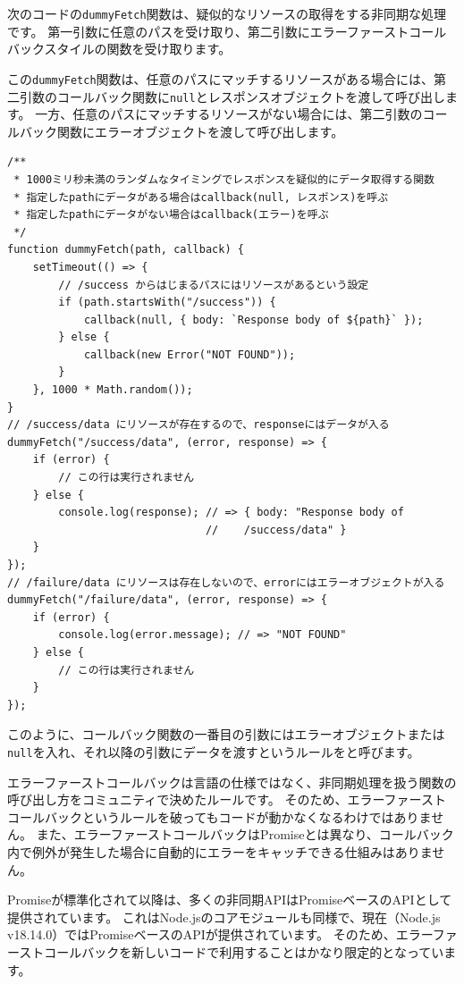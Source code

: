 \begin{tcolorbox}[enhanced jigsaw,breakable,title=エラーファーストコールバック]
次のコードの\texttt{dummyFetch}関数は、疑似的なリソースの取得をする非同期な処理です。
第一引数に任意のパスを受け取り、第二引数にエラーファーストコールバックスタイルの関数を受け取ります。

この\texttt{dummyFetch}関数は、任意のパスにマッチするリソースがある場合には、第二引数のコールバック関数に\texttt{null}とレスポンスオブジェクトを渡して呼び出します。
一方、任意のパスにマッチするリソースがない場合には、第二引数のコールバック関数にエラーオブジェクトを渡して呼び出します。

\begin{lstlisting}
/**
 * 1000ミリ秒未満のランダムなタイミングでレスポンスを疑似的にデータ取得する関数
 * 指定したpathにデータがある場合はcallback(null, レスポンス)を呼ぶ
 * 指定したpathにデータがない場合はcallback(エラー)を呼ぶ
 */
function dummyFetch(path, callback) {
    setTimeout(() => {
        // /success からはじまるパスにはリソースがあるという設定
        if (path.startsWith("/success")) {
            callback(null, { body: `Response body of ${path}` });
        } else {
            callback(new Error("NOT FOUND"));
        }
    }, 1000 * Math.random());
}
// /success/data にリソースが存在するので、responseにはデータが入る
dummyFetch("/success/data", (error, response) => {
    if (error) {
        // この行は実行されません
    } else {
        console.log(response); // => { body: "Response body of 
                               //    /success/data" }
    }
});
// /failure/data にリソースは存在しないので、errorにはエラーオブジェクトが入る
dummyFetch("/failure/data", (error, response) => {
    if (error) {
        console.log(error.message); // => "NOT FOUND"
    } else {
        // この行は実行されません
    }
});
\end{lstlisting}

このように、コールバック関数の一番目の引数にはエラーオブジェクトまたは\texttt{null}を入れ、それ以降の引数にデータを渡すというルールを\textbf{}と呼びます。

エラーファーストコールバックは言語の仕様ではなく、非同期処理を扱う関数の呼び出し方をコミュニティで決めたルールです。
そのため、エラーファーストコールバックというルールを破ってもコードが動かなくなるわけではありません。
また、エラーファーストコールバックはPromiseとは異なり、コールバック内で例外が発生した場合に自動的にエラーをキャッチできる仕組みはありません。

Promiseが標準化されて以降は、多くの非同期APIはPromiseベースのAPIとして提供されています。
これはNode.jsのコアモジュールも同様で、現在（Node.js v18.14.0）ではPromiseベースのAPIが提供されています。
そのため、エラーファーストコールバックを新しいコードで利用することはかなり限定的となっています。
\end{tcolorbox}

